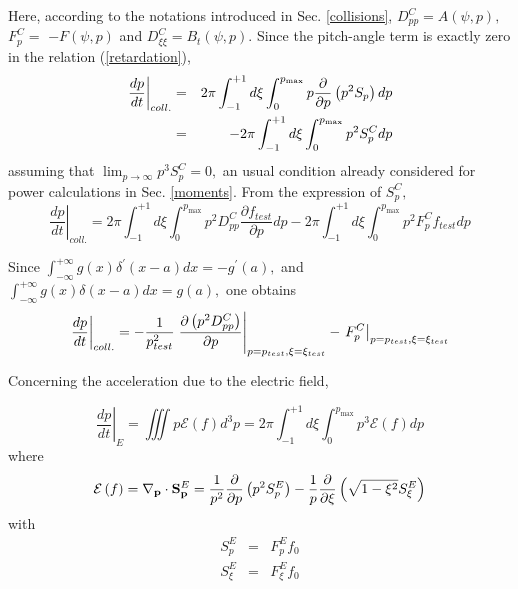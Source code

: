 Here, according to the notations introduced in Sec. \ref{collisions}, $%
D_{pp}^{C}=A\left( \psi ,p\right) ,$ $F_{p}^{C}=$ $-F\left( \psi ,p\right) $
and $D_{\xi \xi }^{C}=B_{t}\left( \psi ,p\right) .$ Since the pitch-angle
term is exactly zero in the relation (\ref{retardation}), 
\begin{eqnarray}
\left. \frac{dp}{dt}\right\vert _{coll.} &=&2\pi \int_{-1}^{+1}d\xi
\int_{0}^{p_{\max }}p\frac{\partial }{\partial p}\left( p^{2}S_{p}\right) dp
\notag \\
&=&-2\pi \int_{-1}^{+1}d\xi \int_{0}^{p_{\max }}p^{2}S_{p}^{C}dp
\end{eqnarray}%
assuming that $\lim_{p\rightarrow \infty }p^{3}S_{p}^{C}=0,$ an usual
condition already considered for power calculations in Sec. \ref{moments}.
From the expression of $S_{p}^{C},$ 
\begin{equation}
\left. \frac{dp}{dt}\right\vert _{coll.}=2\pi \int_{-1}^{+1}d\xi
\int_{0}^{p_{\max }}p^{2}D_{pp}^{C}\frac{\partial f_{test}}{\partial p}%
dp-2\pi \int_{-1}^{+1}d\xi \int_{0}^{p_{\max }}p^{2}F_{p}^{C}f_{test}dp
\end{equation}

Since $\int_{-\infty }^{+\infty }g\left( x\right) \delta ^{\prime }\left(
x-a\right) dx=-g^{\prime }\left( a\right) ,$ and $\int_{-\infty }^{+\infty
}g\left( x\right) \delta \left( x-a\right) dx=g\left( a\right) ,$ one
obtains 
\begin{equation}
\left. \frac{dp}{dt}\right\vert _{coll.}=-\frac{1}{p_{test}^{2}}\left. \frac{%
\partial \left( p^{2}D_{pp}^{C}\right) }{\partial p}\right\vert
_{p=p_{test},\xi =\xi _{test}}-\left. F_{p}^{C}\right\vert _{p=p_{test},\xi
=\xi _{test}}
\end{equation}

Concerning the acceleration due to the electric field,

\begin{equation}
\left. \frac{dp}{dt}\right\vert _{E}=\iiint p\mathcal{E}\left( f\right)
d^{3}p=2\pi \int_{-1}^{+1}d\xi \int_{0}^{p_{\max }}p^{3}\mathcal{E}\left(
f\right) dp
\end{equation}%
where 
\begin{equation}
\mathcal{E}\left( f\right) =\mathbf{\nabla }_{\mathbf{p}}\cdot \mathbf{S}_{%
\mathbf{p}}^{E}=\frac{1}{p^{2}}\frac{\partial }{\partial p}\left(
p^{2}S_{p}^{E}\right) -\frac{1}{p}\frac{\partial }{\partial \xi }\left( 
\sqrt{1-\xi ^{2}}S_{\xi }^{E}\right) 
\end{equation}%
with 
\begin{eqnarray}
S_{p}^{E} &=&F_{p}^{E}f_{0} \\
S_{\xi }^{E} &=&F_{\xi }^{E}f_{0}
\end{eqnarray}

